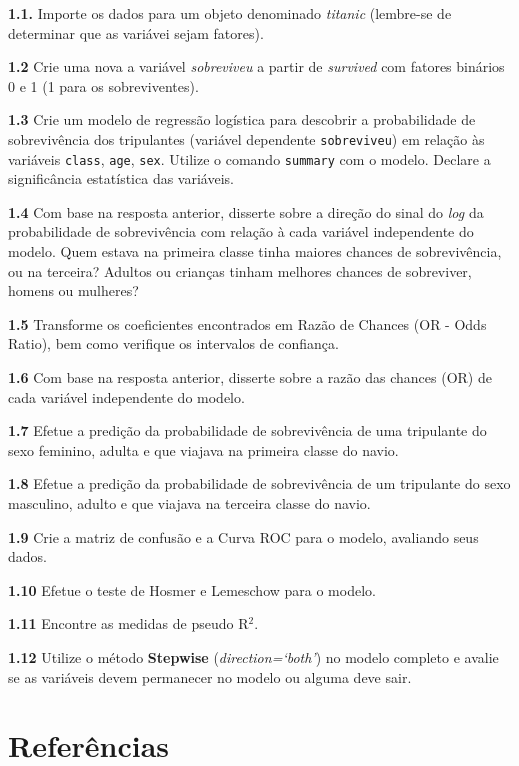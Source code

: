 \documentclass[12pt,brazil,oneside]{book}
\begin{document}
\textbf{1.1.} Importe os dados para um objeto denominado \emph{titanic}
(lembre-se de determinar que as variávei sejam fatores).

\textbf{1.2} Crie uma nova a variável \emph{sobreviveu} a partir de
\emph{survived} com fatores binários 0 e 1 (1 para os sobreviventes).

\textbf{1.3} Crie um modelo de regressão logística para descobrir a
probabilidade de sobrevivência dos tripulantes (variável dependente
\texttt{sobreviveu}) em relação às variáveis \texttt{class},
\texttt{age}, \texttt{sex}. Utilize o comando \texttt{summary} com o
modelo. Declare a significância estatística das variáveis.

\textbf{1.4} Com base na resposta anterior, disserte sobre a direção do
sinal do \emph{log} da probabilidade de sobrevivência com relação à cada
variável independente do modelo. Quem estava na primeira classe tinha
maiores chances de sobrevivência, ou na terceira? Adultos ou crianças
tinham melhores chances de sobreviver, homens ou mulheres?

\textbf{1.5} Transforme os coeficientes encontrados em Razão de Chances
(OR - Odds Ratio), bem como verifique os intervalos de confiança.

\textbf{1.6} Com base na resposta anterior, disserte sobre a razão das
chances (OR) de cada variável independente do modelo.

\textbf{1.7} Efetue a predição da probabilidade de sobrevivência de uma
tripulante do sexo feminino, adulta e que viajava na primeira classe do
navio.

\textbf{1.8} Efetue a predição da probabilidade de sobrevivência de um
tripulante do sexo masculino, adulto e que viajava na terceira classe do
navio.

\textbf{1.9} Crie a matriz de confusão e a Curva ROC para o modelo,
avaliando seus dados.

\textbf{1.10} Efetue o teste de Hosmer e Lemeschow para o modelo.

\textbf{1.11} Encontre as medidas de pseudo R\(^2\).

\textbf{1.12} Utilize o método \textbf{Stepwise}
(\emph{direction=`both'}) no modelo completo e avalie se as variáveis
devem permanecer no modelo ou alguma deve sair.

\hypertarget{referencias}{%
\chapter*{Referências}\label{referencias}}
\end{document}
